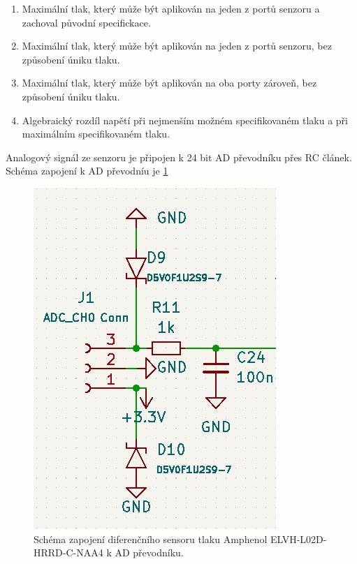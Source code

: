 \begin{table}[H]
\begin{enumerate}
        \item \label{enum:amp_proof_pressure} Maximální tlak, který může být aplikován na jeden z portů senzoru a zachoval původní specifickace.
        \item \label{enum:amp_burst_pressure} Maximální tlak, který může být aplikován na jeden z portů senzoru, bez způsobení úniku tlaku.
        \item \label{enum:amp_common_pressure} Maximální tlak, který může být aplikován na oba porty zároveň, bez způsobení úniku tlaku.
        \item \label{enum:amp_fss} Algebraický rozdíl napětí při nejmenším možném specifikovaném tlaku a při maximálním specifikovaném tlaku.
    \end{enumerate}
\end{table}
\raggedbottom
Analogový signál ze senzoru je připojen k 24 bit AD převodníku přes RC článek. Schéma zapojení k AD převodníu je \ref{fig:amphenol_circuit}

\begin{figure}[H]
    \centering
    \includegraphics[width=0.7\linewidth]{pictures/diff_sen_circuit.jpg}
    \caption{Schéma zapojení diferenčního sensoru tlaku Amphenol ELVH-L02D-HRRD-C-NAA4 k AD převodníku.}
    \label{fig:amphenol_circuit}
\end{figure}

